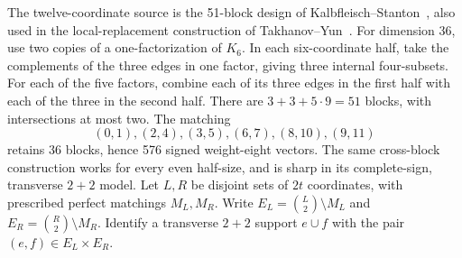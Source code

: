 The twelve-coordinate source is the 51-block design of
Kalbfleisch--Stanton~\cite[Theorem 7]{kalbfleisch-stanton}, also used
in the local-replacement construction of
Takhanov--Yun~\cite[Section V]{signed-johnson}.
For dimension 36, use two copies of a one-factorization of $K_6$. In each
six-coordinate half, take the complements of the three edges in one
factor, giving three internal four-subsets. For each of the five factors,
combine each of its three edges in the first half with each of the three
in the second half. There are $3+3+5\cdot9=51$ blocks, with intersections
at most two. The matching
\[
(0,1),(2,4),(3,5),(6,7),(8,10),(9,11)
\]
retains 36 blocks, hence 576 signed weight-eight vectors.
The same cross-block construction works for every even half-size, and
is sharp in its complete-sign, transverse $2+2$ model. Let $L,R$ be
disjoint sets of $2t$ coordinates, with prescribed perfect matchings
$M_L,M_R$. Write $E_L=\binom L2\setminus M_L$ and
$E_R=\binom R2\setminus M_R$. Identify a transverse $2+2$ support
$e\cup f$ with the pair $(e,f)\in E_L\times E_R$.

